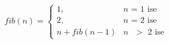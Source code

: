 \documentclass{article}
\begin{document}
$$
fib(n) =
\begin{cases}
1,  & \text{$n$ = 1 ise} \\
2,  & \text{$n$ = 2 ise}  \\
n+fib(n-1) &\text{$n$ $>$ 2 ise}
\end{cases}
$$
\end{document}
